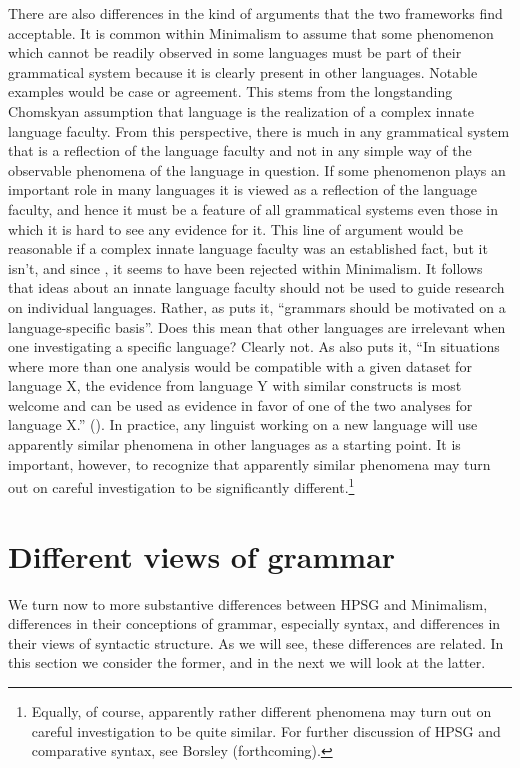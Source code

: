 \documentclass[output=paper]{langsci/langscibook}
\begin{document}
There are also differences in the kind of arguments that the two frameworks find acceptable. It is
common within Minimalism to assume that some phenomenon which cannot be readily observed in some
languages must be part of their grammatical system because it is clearly present in other
languages. Notable examples would be case or agreement. This stems from the longstanding Chomskyan
assumption that language is the realization of a complex innate language faculty. From this
perspective, there is much in any grammatical system that is a reflection of the language faculty
and not in any simple way of the observable phenomena of the language in question. If some
phenomenon plays an important role in many languages it is viewed as a reflection of the language
faculty, and hence it must be a feature of all grammatical systems even those in which it is hard to
see any evidence for it. This line of argument would be reasonable if a complex innate language
faculty was an established fact, but it isn't, and since \citet*{HCF2002a}, it seems to have been
rejected within Minimalism.  It follows that ideas about an innate language faculty should not be
used to guide research on individual languages. Rather, as \citet[25]{MuellerCoreGram} puts it,
``grammars should be motivated on a language-specific basis''. Does this mean that other languages are
irrelevant when one investigating a specific language? Clearly not. As 
also puts it, ``In situations where more than one analysis would be compatible with a given dataset
for language X, the evidence from language Y with similar constructs is most welcome and can be used
as evidence in favor of one of the two analyses for language X.'' (\citeyear[43]{MuellerCoreGram}). In
practice, any linguist working on a new language will use apparently similar phenomena in other
languages as a starting point. It is important, however, to recognize that apparently similar
phenomena may turn out on careful investigation to be significantly different.\footnote{%
  Equally, of course, apparently rather different phenomena may turn out on careful investigation to
  be quite similar. For further discussion of HPSG and comparative syntax, see Borsley
  (forthcoming).%
} 

\section{Different views of grammar}
\label{sec:min-views-grammar}
We turn now to more substantive differences between HPSG and Minimalism, differences in their conceptions of grammar, especially syntax, and differences in their views of syntactic structure. As we will see, these differences are related. In this section we consider the former, and in the next we will look at the latter.
\end{document}
